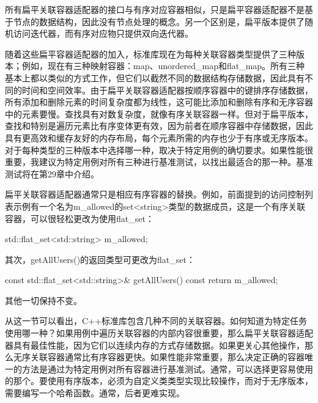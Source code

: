 所有扁平关联容器适配器的接口与有序对应容器相似，只是扁平容器适配器不是基于节点的数据结构，因此没有节点处理的概念。另一个区别是，扁平版本提供了随机访问迭代器，而有序对应物只提供双向迭代器。

随着这些扁平容器适配器的加入，标准库现在为每种关联容器类型提供了三种版本；例如，现在有三种映射容器：map、unordered\_map和flat\_map。所有三种基本上都以类似的方式工作，但它们以截然不同的数据结构存储数据，因此具有不同的时间和空间效率。由于扁平关联容器适配器按顺序容器中的键排序存储数据，所有添加和删除元素的时间复杂度都为线性，这可能比添加和删除有序和无序容器中的元素要慢。查找具有对数复杂度，就像有序关联容器一样。但对于扁平版本，查找和特别是遍历元素比有序变体更有效，因为前者在顺序容器中存储数据，因此具有更高效和缓存友好的内存布局，每个元素所需的内存也少于有序或无序版本。对于每种类型的三种版本中选择哪一种，取决于特定用例的确切要求。如果性能很重要，我建议为特定用例对所有三种进行基准测试，以找出最适合的那一种。基准测试将在第29章中介绍。

扁平关联容器适配器通常只是相应有序容器的替换。例如，前面提到的访问控制列表示例有一个名为m\_allowed的set<string>类型的数据成员，这是一个有序关联容器，可以很轻松更改为使用flat\_set：

\begin{cpp}
std::flat_set<std::string> m_allowed;
\end{cpp}

其次，getAllUsers()的返回类型可更改为flat\_set：

\begin{cpp}
const std::flat_set<std::string>& getAllUsers() const { return m_allowed; }
\end{cpp}

其他一切保持不变。


从这一节可以看出，C++标准库包含几种不同的关联容器。如何知道为特定任务使用哪一种？如果用例中遍历关联容器的内部内容很重要，那么扁平关联容器适配器具有最佳性能，因为它们以连续内存的方式存储数据。如果更关心其他操作，那么无序关联容器通常比有序容器更快。如果性能非常重要，那么决定正确的容器唯一的方法是通过为特定用例对所有容器进行基准测试。通常，可以选择更容易使用的那个。要使用有序版本，必须为自定义类类型实现比较操作，而对于无序版本，需要编写一个哈希函数。通常，后者更难实现。










